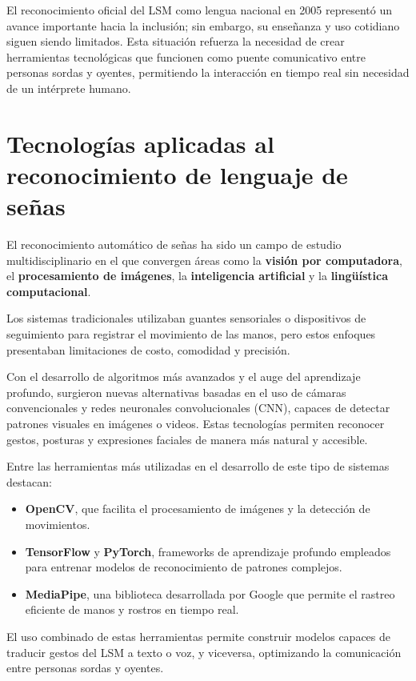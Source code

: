 \documentclass[12pt, oneside]{report}
\begin{document}
El reconocimiento oficial del LSM como lengua nacional en 2005 representó un avance importante hacia la inclusión; sin embargo, su enseñanza y uso cotidiano siguen siendo limitados. Esta situación refuerza la necesidad de crear herramientas tecnológicas que funcionen como puente comunicativo entre personas sordas y oyentes, permitiendo la interacción en tiempo real sin necesidad de un intérprete humano.

\section{Tecnologías aplicadas al reconocimiento de lenguaje de señas}
El reconocimiento automático de señas ha sido un campo de estudio multidisciplinario en el que convergen áreas como la \textbf{visión por computadora}, el \textbf{procesamiento de imágenes}, la \textbf{inteligencia artificial} y la \textbf{lingüística computacional}.

Los sistemas tradicionales utilizaban guantes sensoriales o dispositivos de seguimiento para registrar el movimiento de las manos, pero estos enfoques presentaban limitaciones de costo, comodidad y precisión.

Con el desarrollo de algoritmos más avanzados y el auge del aprendizaje profundo, surgieron nuevas alternativas basadas en el uso de cámaras convencionales y redes neuronales convolucionales (CNN), capaces de detectar patrones visuales en imágenes o videos. Estas tecnologías permiten reconocer gestos, posturas y expresiones faciales de manera más natural y accesible.

Entre las herramientas más utilizadas en el desarrollo de este tipo de sistemas destacan:
\begin{itemize}
  \item \textbf{OpenCV}, que facilita el procesamiento de imágenes y la detección de movimientos.
  \item \textbf{TensorFlow} y \textbf{PyTorch}, frameworks de aprendizaje profundo empleados para entrenar modelos de reconocimiento de patrones complejos.
  \item \textbf{MediaPipe}, una biblioteca desarrollada por Google que permite el rastreo eficiente de manos y rostros en tiempo real.
\end{itemize}

El uso combinado de estas herramientas permite construir modelos capaces de traducir gestos del LSM a texto o voz, y viceversa, optimizando la comunicación entre personas sordas y oyentes.
\end{document}
